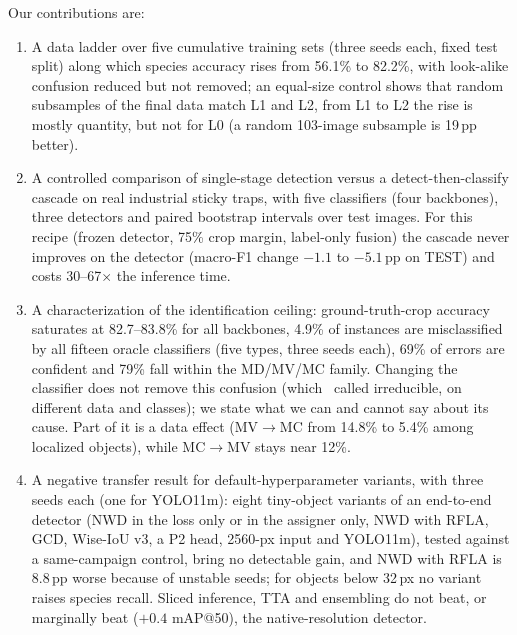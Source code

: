 Our contributions are:
\begin{enumerate}
    \item A data ladder over five cumulative training sets (three seeds each, fixed test split) along which species accuracy rises from 56.1\% to 82.2\%, with look-alike confusion reduced but not removed; an equal-size control shows that random subsamples of the final data match L1 and L2, from L1 to L2 the rise is mostly quantity, but not for L0 (a random 103-image subsample is 19\,pp better).
    \item A controlled comparison of single-stage detection versus a detect-then-classify cascade on real industrial sticky traps, with five classifiers (four backbones), three detectors and paired bootstrap intervals over test images. For this recipe (frozen detector, 75\% crop margin, label-only fusion) the cascade never improves on the detector (macro-F1 change $-1.1$ to $-5.1$\,pp on TEST) and costs 30--67$\times$ the inference time.
    \item A characterization of the identification ceiling: ground-truth-crop accuracy saturates at 82.7--83.8\% for all backbones, 4.9\% of instances are misclassified by all fifteen oracle classifiers (five types, three seeds each), 69\% of errors are confident and 79\% fall within the MD/MV/MC family. Changing the classifier does not remove this confusion (which~\cite{pacbb2026} called irreducible, on different data and classes); we state what we can and cannot say about its cause. Part of it is a data effect (MV$\to$MC from 14.8\% to 5.4\% among localized objects), while MC$\to$MV stays near 12\%.
    \item A negative transfer result for default-hyperparameter variants, with three seeds each (one for YOLO11m): eight tiny-object variants of an end-to-end detector (NWD in the loss only or in the assigner only, NWD with RFLA, GCD, Wise-IoU v3, a P2 head, 2560-px input and YOLO11m), tested against a same-campaign control, bring no detectable gain, and NWD with RFLA is 8.8\,pp worse because of unstable seeds; for objects below 32\,px no variant raises species recall. Sliced inference, TTA and ensembling do not beat, or marginally beat ($+0.4$ mAP@50), the native-resolution detector.
\end{enumerate}
